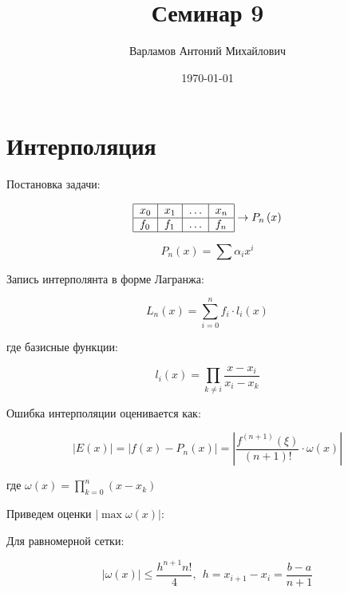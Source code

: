 \documentclass[10pt,a4paper]{article}
\title{Семинар 9}
\date{\today}
\author{Варламов Антоний Михайлович}
\begin{document}
	\maketitle
	
	\section{Интерполяция}
	
	Постановка задачи:
	
	\begin{equation}
	\centering
	\begin{tabular}{|l|l|l|l|}
	\hline
		$x_{0}$ & $x_{1}$ & $\ldots$ & $x_{n}$ \\ \hline
		$f_{0}$ & $f_{1}$ & $\ldots$ & $f_{n}$ \\ \hline
	\end{tabular} \rightarrow P_{n}\left(x\right)
	\end{equation}
	
	\begin{equation}
		P_{n}\left(x\right) = \sum\limits \alpha_{i}x^{i}
	\end{equation}
	
	Запись интерполянта в форме Лагранжа:
	
	\begin{equation}
		L_{n}\left(x\right) = \sum\limits_{i = 0}^{n}f_{i}\cdot l_{i}\left(x
		\right)
	\end{equation}
	
	где базисные функции:
	
	\begin{equation}
		l_{i}\left(x\right) = \prod\limits_{k \neq i} \frac{x - x_{i}}
		{x_{i} - x_{k}}
	\end{equation}
	
	Ошибка интерполяции оценивается как:
	
	\begin{equation}
		\left|E\left(x\right)\right| = \left|f\left(x\right) - P_{n}\left(x
		\right)\right| = \left|\frac{f^{\left(n + 1\right)}\left(\xi\right)}
		{\left(n + 1\right)!}\cdot \omega\left(x\right)\right|
	\end{equation}
	
	где $\omega\left(x\right) = \prod\limits_{k = 0}^{n}\left(x - x_{k}\right)$
	
	Приведем оценки $\left|\max\omega\left(x\right)\right|$:
	
	Для равномерной сетки:
	
	\begin{equation}
		\left|\omega\left(x\right)\right| \leqslant \frac{h^{n+1}n!}{4}, \ \ 
		h = x_{i + 1} - x_{i} = \frac{b - a}{n + 1}
	\end{equation}
	
\end{document}
